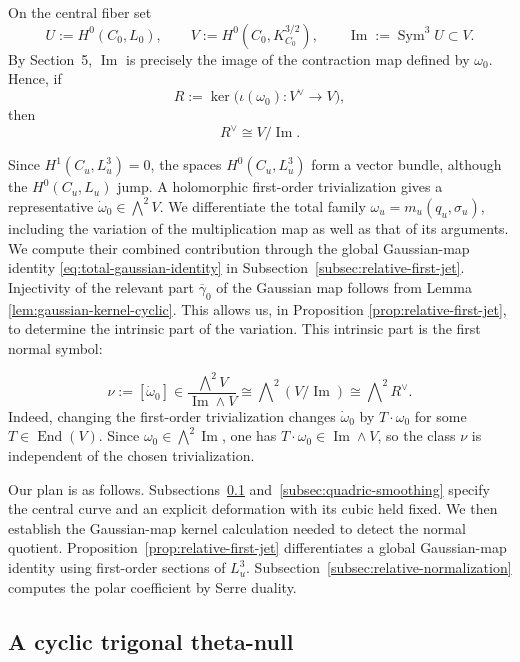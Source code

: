\documentclass[11pt]{article}
\begin{document}
On the central fiber set
\[
U:=H^0(C_0,L_0),
\qquad
V:=H^0(C_0,K_{C_0}^{3/2}),
\qquad
\operatorname{Im}:=\operatorname{Sym}^3U\subset V.
\]
By Section~5, $\operatorname{Im}$ is precisely the image of the
contraction map defined by $\omega_0$.  Hence, if
\[
R:=\ker\bigl(\iota(\omega_0):V^\vee\longrightarrow V\bigr),
\]
then
\[
R^\vee\cong V/\operatorname{Im}.
\]

\begingroup
Since $H^1(C_u,L_u^3)=0$, the spaces $H^0(C_u,L_u^3)$ form a vector
bundle, {although the $H^0(C_u,L_u)$ jump.} A holomorphic first-order trivialization gives a representative
$\dot\omega_0\in\bigwedge^2V$. We differentiate the total family
$\omega_u=m_u(q_u,\sigma_u)$, including the variation of the
multiplication map as well as that of its arguments. We compute
their combined contribution through the global Gaussian-map
identity
{\eqref{eq:total-gaussian-identity}}
in Subsection~\ref{subsec:relative-first-jet}.
{Injectivity of the relevant part $\overline{\gamma}_0$ of the Gaussian map
follows from Lemma \ref{lem:gaussian-kernel-cyclic}.
This allows us, in Proposition \ref{prop:relative-first-jet},
to determine the intrinsic part of the variation.
This intrinsic part is the first normal symbol:}
\endgroup


\begin{equation}
\label{eq:intrinsic-first-normal-symbol}
\nu:=[\dot\omega_0]
\in
\frac{\bigwedge^2V}{\operatorname{Im}\wedge V}
\cong
\bigwedge\nolimits^2(V/\operatorname{Im})
\cong
\bigwedge\nolimits^2R^\vee.
\end{equation}
Indeed, changing the first-order trivialization changes
$\dot\omega_0$ by $T\cdot\omega_0$ for some $T\in\operatorname{End}(V)$.
Since $\omega_0\in\bigwedge^2\operatorname{Im}$, one has
${T}\cdot\omega_0\in\operatorname{Im}\wedge V$, so the class $\nu$ is independent of
the chosen trivialization.

Our plan is as follows. Subsections~\ref{subsec:cyclic-theta-null}
and~\ref{subsec:quadric-smoothing} specify the central curve and {an}
explicit deformation with its cubic held fixed. We then establish the
Gaussian-map kernel calculation needed to detect the normal quotient.
Proposition~\ref{prop:relative-first-jet} differentiates a global
Gaussian-map identity using
first-order sections of $L_u^3$.
Subsection~\ref{subsec:relative-normalization} computes the polar
coefficient by Serre duality.



\subsection{A cyclic trigonal theta-null}
\label{subsec:cyclic-theta-null}
\end{document}
